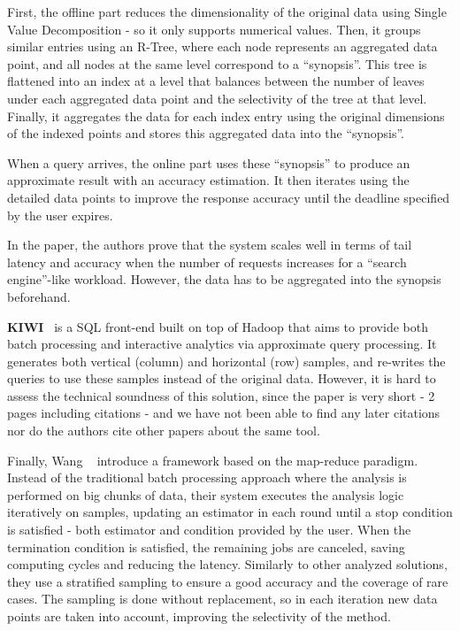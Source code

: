 First, the offline part reduces the dimensionality of the original data using 
Single Value Decomposition - so it only supports numerical values. 
Then, it groups similar entries using an R-Tree, where each node represents an 
aggregated data point, and all nodes at the same level correspond to a 
``synopsis''. This tree is flattened into an index at a level that balances 
between the number of leaves under each aggregated data point and the 
selectivity of the tree at that level. Finally, it aggregates the data for 
each index entry using the original dimensions of the indexed points and stores 
this aggregated data into the ``synopsis''.

When a query arrives, the online part uses these ``synopsis'' to produce 
an approximate result with an accuracy estimation. It then iterates 
using the detailed data points to improve the response accuracy until the
deadline specified by the user expires.

In the paper, the authors prove that the system scales well in terms 
of tail latency and accuracy when the number of requests increases for a 
``search engine''-like workload. However, the data has to be aggregated into 
the synopsis beforehand.

\medskip

\textbf{KIWI}~\cite{Kim2015} is a SQL front-end built on top of Hadoop that aims 
to provide both batch processing and interactive analytics via approximate
query processing. It generates both vertical (column) and horizontal (row) 
samples, and re-writes the queries to use these samples instead of the original 
data. However, it is hard to assess the technical soundness of this 
solution, since the paper is very short - 2 pages including citations -
and we have not been able to find any later citations nor do the authors cite 
other papers about the same tool.

\medskip

Finally, Wang \etal~\cite{WangYi2015} introduce a framework based on the 
map-reduce paradigm. Instead of the traditional batch processing approach 
where the analysis is performed on big chunks of data, their system executes the 
analysis logic iteratively on samples, updating an estimator in each round 
until a stop condition is satisfied - both estimator and condition provided by 
the user. When the termination condition is satisfied, the remaining jobs are 
canceled, saving computing cycles and reducing the latency. Similarly to other 
analyzed solutions, they use a stratified sampling to ensure a good accuracy and 
the coverage of rare cases. 
The sampling is done without replacement, so in each iteration new data points 
are taken into account, improving the selectivity of the method.

